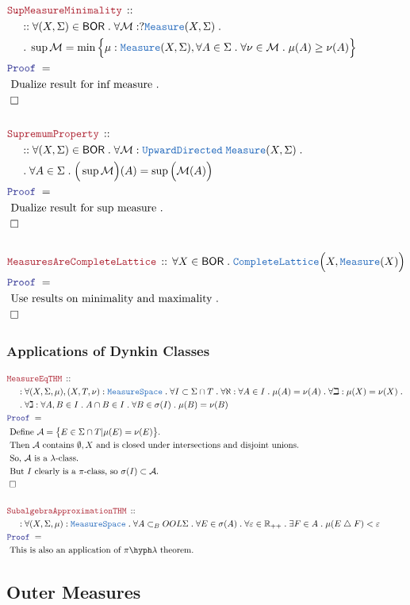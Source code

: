 \documentclass[12pt]{scrartcl}
\newcommand{\TYPE}[1]{\textcolor{NavyBlue}{\mathtt{#1}}}
\newcommand{\LOGIC}[1]{\textcolor{Blue}{\mathtt{#1}}}
\newcommand{\THM}[1]{\textcolor{Maroon}{\mathtt{#1}}}
\renewcommand{\.}{\; . \;}
\newcommand{\Theorem}[2]{& \THM{#1} \, :: \, #2 \\ & \Proof = \\ }
\newcommand{\NewLine}{\\ & \kern 1pc}
\newcommand{\Page}[1]{ \begin{align*} #1 \end{align*}   }
\newcommand{\Reals}{\mathbb{R} }
\newcommand{\du}{\; \triangle \;}
\newcommand{\QED}{\; \square}
\newcommand{\EndProof}{& \QED \\}
\newcommand{\Proof}{\LOGIC{Proof} \; }
\newcommand{\Explain}[1]{& \text{#1.} \\}
\newcommand{\A}{\mathcal{A}}
\newcommand{\BOR}{\mathsf{BOR}}
\newcommand{\Measure}{\TYPE{Measure}}
\newcommand{\MS}{\TYPE{MeasureSpace}}
\begin{document}
\Page{
	\Theorem{SupMeasureMinimality}
	{
		\NewLine ::		
		\forall (X,\Sigma) \in \BOR \.
		\forall \mathcal{M} : ?\Measure(X,\Sigma) \. \NewLine \.
		\sup {\mathcal{M}} = 
		\min \Big\{ 
			\mu : \Measure(X,\Sigma), 
			\forall A \in \Sigma \. 
			\forall \nu \in \mathcal{M}  \.
			\mu(A) \ge \nu(A)
		\Big\}
	}
	\Explain{ Dualize result for inf measure }
	\EndProof
	\\
	\Theorem{SupremumProperty}
	{
		\NewLine ::
		\forall (X,\Sigma) \in \BOR \.
		\forall \mathcal{M} : \TYPE{UpwardDirected}\;\Measure(X,\Sigma) \. \NewLine \.
		\forall A \in \Sigma \.
		\Big( \sup \mathcal{M}\Big)(A) = \sup \Big(\mathcal{M}(A)\Big) 
	}
	\Explain{ Dualize result for sup measure }
	\EndProof
	\\
	\Theorem{MeasuresAreCompleteLattice}
	{
		\forall X \in \BOR \.
		\TYPE{CompleteLattice}\Big( X, \Measure(X)  \Big)
	}
	\Explain{ Use results on minimality and maximality }
	\EndProof
}
\newpage
\subsubsection{Applications of Dynkin Classes}
\Page{
	\Theorem{MeasureEqTHM}
	{
		\NewLine :		
		\forall (X,\Sigma,\mu),(X,T,\nu)  : \MS \.
		\forall I \subset \Sigma \cap T \.
		\forall \aleph : \forall A \in I \. \mu(A) = \nu(A) \.
		\forall \beth  : \mu(X) = \nu(X) \. \NewLine \.
		\forall \gimel : \forall A,B \in I \. A \cap B \in I \.
		\forall B \in \sigma(I) \. 
		\mu(B) = \nu(B)
	}
	\Explain{ 
		Define $\A = \big\{ E \in \Sigma \cap T | \mu(E) = \nu(E) \big\}$}
	\Explain{
		Then $\A$  contains $\emptyset, X$ and is closed under intersections
		and disjoint unions}
	\Explain{
		So, $\A$ is a $\lambda$-class}
	\Explain{
		But $I$ clearly is a $\pi$-class, so $\sigma(I) \subset \A$}
	\EndProof
	\\
	\Theorem{SubalgebraApproximationTHM}
	{
		\NewLine :
		\forall (X,\Sigma,\mu) : \MS \.
		\forall A \subset_BOOL \Sigma \.
		\forall E \in \sigma(A) \.
		\forall \varepsilon \in \Reals_{++} \.
		\exists F \in A \.
		\mu(E \du F) < \varepsilon
	}
	\Explain{ 
		This is also an application of $\pi\hyph\lambda$ theorem}
}
\newpage
\subsection{Outer Measures}
\end{document}
